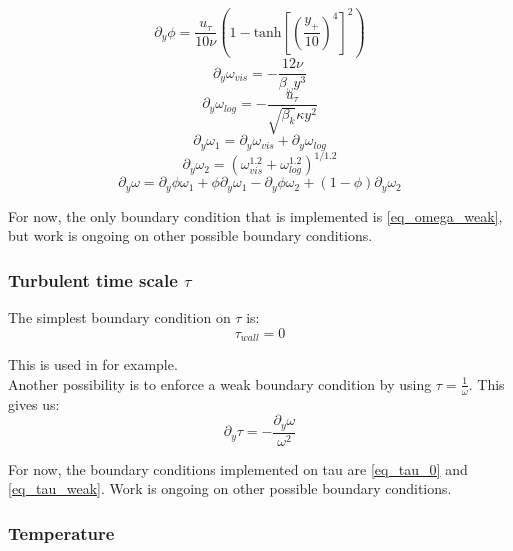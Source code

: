 \begin{equation}
	\partial_y\phi = \frac{u_\tau}{10\nu}\left(1-\text{tanh}\left[\left(\frac{y_+}{10}\right)^4\right]^2\right)
\end{equation}
\begin{equation}
	\partial_y\omega_{vis} = -\frac{12\nu}{\beta_\omega y^3}
\end{equation}\begin{equation}
	\partial_y\omega_{log} = - \frac{u_\tau}{\sqrt{\beta_k}\kappa y^2}
\end{equation}
\begin{equation}
	\partial_y\omega_{1} = \partial_y\omega_{vis}+\partial_y\omega_{log}
\end{equation}
\begin{equation}
	\partial_y\omega_{2} =(\omega_{vis}^{1.2}+\omega_{log}^{1.2})^{1/1.2}
\end{equation}
\begin{equation} \label{eq_omega_weak}
	\partial_y\omega = \partial_y\phi \omega_{1} + \phi \partial_y\omega_{1} -\partial_y\phi \omega_{2} + (1-\phi) \partial_y \omega_{2}
\end{equation}

For now, the only boundary condition that is implemented is \eqref{eq_omega_weak}, but work is ongoing on other possible boundary conditions.

\subsubsection{Turbulent time scale $\tau$}

The simplest boundary condition on $\tau$ is:
\begin{equation}\label{eq_tau_0}
	\tau_{wall}=0
\end{equation}

This is used in \cite{NEK50002020} for example. \\

Another possibility is to enforce a weak boundary condition by using $\tau = \frac{1}{\omega}$. This gives us:
\begin{equation}\label{eq_tau_weak}
	\partial_y\tau = -\frac{\partial_y\omega}{\omega^2}
\end{equation}

For now, the boundary conditions implemented on tau are \eqref{eq_tau_0} and \eqref{eq_tau_weak}. Work is ongoing on other possible boundary conditions.

\subsubsection{Temperature}

